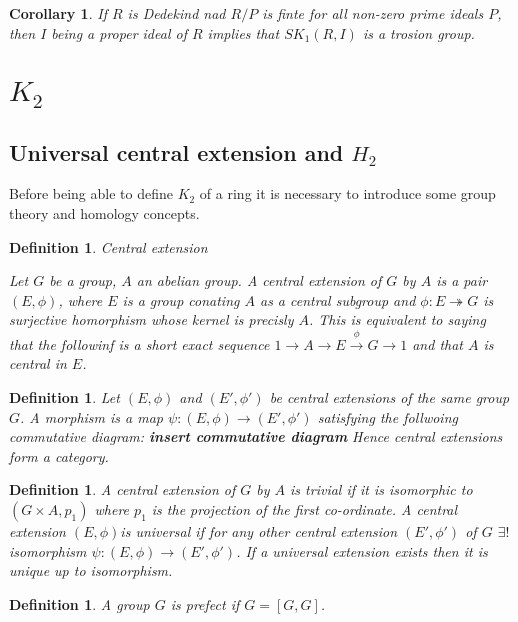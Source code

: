 \documentclass[a4paper,10pt]{article}
\newtheorem{defn}[thm]{Definition}
\newtheorem{cor}[thm]{Corollary}
\begin{document}
\begin{cor}
If $R$ is Dedekind nad $R/P$ is finte for all non-zero prime ideals $P$, then $I$ being a proper ideal of $R$ implies that $SK_{1}(R,I)$ is a trosion group.
\end{cor}

\clearpage

\section{$K_{2}$}

\subsection{Universal central extension and $H_{2}$}

Before being able to define $K_{2}$ of a ring it is necessary to introduce some group theory and homology concepts.

\begin{defn}{Central extension}

Let $G$ be a group, $A$ an abelian group. A central extension of $G$ by $A$ is a pair $(E,\phi)$, where $E$ is a group conating $A$ as a central subgroup and $\phi:E\twoheadrightarrow G$ is surjective homorphism whose kernel is precisly $A$. This is equivalent to saying that the followinf is a short exact sequence $1\rightarrow A \rightarrow E \stackrel{\phi}{\rightarrow} G \rightarrow 1$ and that $A$ is central in $E$.
\end{defn}

\begin{defn}
Let $(E,\phi)$ and $(E',\phi')$ be central extensions of the same group $G$. A morphism is a map $\psi:(E,\phi)\rightarrow (E',\phi')$ satisfying the follwoing commutative diagram:
\textbf{insert commutative diagram}
Hence central extensions form a category.
\end{defn}

\begin{defn}
A central extension of $G$ by $A$ is trivial if it is isomorphic to $(G\times A,p_{1})$ where $p_{1}$ is the projection of the first co-ordinate.
\newline A central extension $(E,\phi)$is universal if for any other central extension $(E',\phi')$ of $G$ $\exists !$ isomorphism $\psi:(E,\phi)\rightarrow (E',\phi')$. If a universal extension exists then it is unique up to isomorphism.
\end{defn}

\begin{defn}
A group $G$ is prefect if $G=[G,G]$.
\end{defn}
\end{document}
